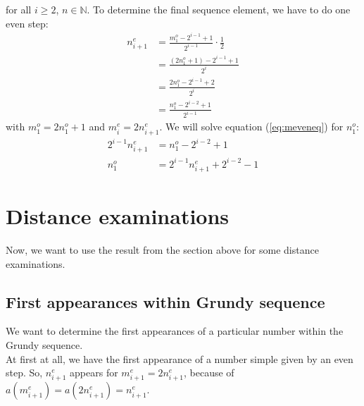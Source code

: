 \documentclass[12pt]{../document-templates/papers/one-column-mydashie/mydashie}
\newtheorem*{theorem A}{Theorem A}
\newtheorem*{theorem B}{N\"olker's Theorem}
\theoremstyle{remark}
\theoremstyle{remark}
\begin{document}
for all $i \geq 2$, $n \in \mathbb{N}$. To determine the final sequence element, we have to do one even step:
\begin{equation}
    \begin{split}
        n_{i+1}^{e} &= \frac{m_{1}^{o} - 2^{i-1} + 1}{2^{i-1}} \cdot \frac{1}{2}\\
            &= \frac{\left(2n_{1}^{o} + 1\right) - 2^{i-1} + 1}{2^{i}}\\
            &= \frac{2n_{1}^{o} - 2^{i-1} + 2}{2^{i}}\\
            &= \frac{n_{1}^{o} - 2^{i-2} + 1}{2^{i-1}}
    \end{split}
\label{eq:meveneq}
\end{equation}
with $m_{1}^{o} = 2n_{1}^{o} + 1$ and $m_{i}^{e} = 2n_{i+1}^{e}$. We will solve equation (\ref{eq:meveneq}) for $n_{1}^{o}$:
\begin{equation}
    \begin{split}
        2^{i-1}n_{i+1}^{e} &= n_{1}^{o} - 2^{i-2} + 1\\
        n_{1}^{o} &= 2^{i-1}n_{i+1}^{e} + 2^{i-2} - 1
    \end{split}
\label{eq:maineq}
\end{equation}
\section{Distance examinations}
\label{s:distanceexamination}
Now, we want to use the result from the section above for some distance examinations.
\subsection{First appearances within Grundy sequence}
\label{ss:firstappearanceswithingrundysequence}
We want to determine the first appearances of a particular number within the Grundy sequence.\\

At first at all, we have the first appearance of a number simple given by an even step. So, $n_{i+1}^{e}$ appears for $m_{i+1}^{e} = 2n_{i+1}^{e}$, because of $a\left(m_{i+1}^{e}\right) = a\left(2n_{i+1}^{e}\right) = n_{i+1}^{e}$.\\
\end{document}

